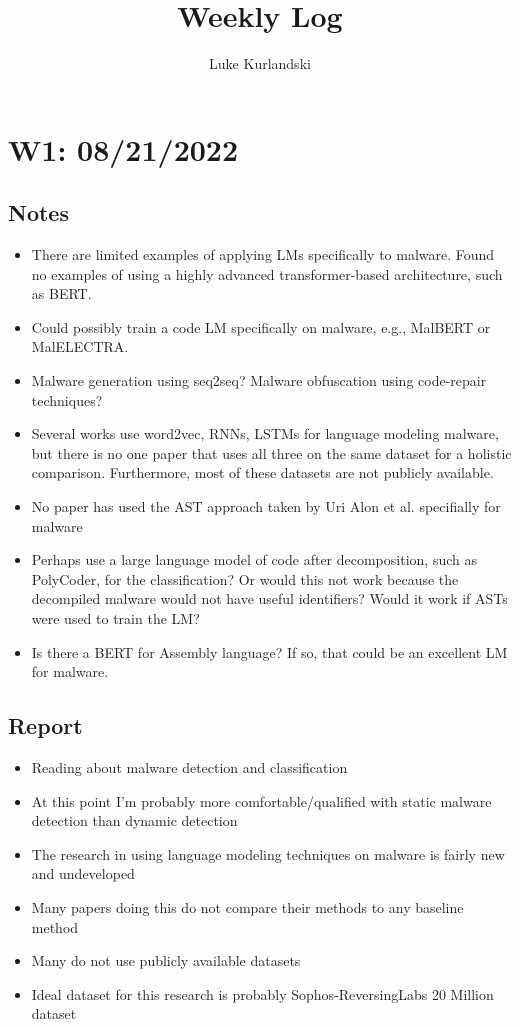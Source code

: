 \documentclass{article}
\title{Weekly Log}
\author{Luke Kurlandski}
\begin{document}
\maketitle


\section*{W1: 08/21/2022}

\subsection*{Notes}

\begin{itemize}
\item There are limited examples of applying LMs specifically to malware. Found no examples of using a highly advanced transformer-based architecture, such as BERT.
\item Could possibly train a code LM specifically on malware, e.g., MalBERT or MalELECTRA.
\item Malware generation using seq2seq? Malware obfuscation using code-repair techniques?
\item Several works use word2vec, RNNs, LSTMs for language modeling malware, but there is no one paper that uses all three on the same dataset for a holistic comparison. Furthermore, most of these datasets are not publicly available.
\item No paper has used the AST approach taken by Uri Alon et al. specifially for malware
\item Perhaps use a large language model of code after decomposition, such as PolyCoder, for the classification? Or would this not work because the decompiled malware would not have useful identifiers? Would it work if ASTs were used to train the LM?
\item Is there a BERT for Assembly language? If so, that could be an excellent LM for malware.
\end{itemize}

\subsection*{Report}

\begin{itemize}
\item Reading about malware detection and classification
\item At this point I'm probably more comfortable/qualified with static malware detection than dynamic detection
\item The research in using language modeling techniques on malware is fairly new and undeveloped
\item Many papers doing this do not compare their methods to any baseline method
\item Many do not use publicly available datasets
\item Ideal dataset for this research is probably Sophos-ReversingLabs 20 Million dataset
\end{itemize}
\end{document}
